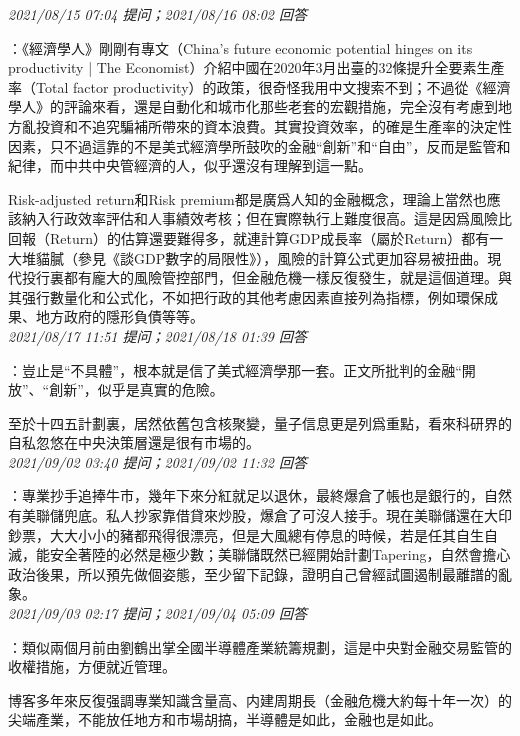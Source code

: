 \documentclass[twocolumn]{ctexart}
\begin{document}
\textit{\hfill\noindent\small 2021/08/15 07:04 提问；2021/08/16 08:02 回答}

：《經濟學人》剛剛有專文（China’s future economic potential hinges on its productivity | The Economist）介紹中國在2020年3月出臺的32條提升全要素生產率（Total factor productivity）的政策，很奇怪我用中文搜索不到；不過從《經濟學人》的評論來看，還是自動化和城市化那些老套的宏觀措施，完全沒有考慮到地方亂投資和不追究騙補所帶來的資本浪費。其實投資效率，的確是生產率的決定性因素，只不過這靠的不是美式經濟學所鼓吹的金融“創新”和“自由”，反而是監管和紀律，而中共中央管經濟的人，似乎還沒有理解到這一點。


Risk-adjusted return和Risk premium都是廣爲人知的金融概念，理論上當然也應該納入行政效率評估和人事績效考核；但在實際執行上難度很高。這是因爲風險比回報（Return）的估算還要難得多，就連計算GDP成長率（屬於Return）都有一大堆貓膩（參見《談GDP數字的局限性》），風險的計算公式更加容易被扭曲。現代投行裏都有龐大的風險管控部門，但金融危機一樣反復發生，就是這個道理。與其强行數量化和公式化，不如把行政的其他考慮因素直接列為指標，例如環保成果、地方政府的隱形負債等等。
\\

\textit{\hfill\noindent\small 2021/08/17 11:51 提问；2021/08/18 01:39 回答}

：豈止是“不具體”，根本就是信了美式經濟學那一套。正文所批判的金融“開放”、“創新”，似乎是真實的危險。

至於十四五計劃裏，居然依舊包含核聚變，量子信息更是列爲重點，看來科研界的自私忽悠在中央決策層還是很有市場的。
\\

\textit{\hfill\noindent\small 2021/09/02 03:40 提问；2021/09/02 11:32 回答}

：專業抄手追捧牛市，幾年下來分紅就足以退休，最終爆倉了帳也是銀行的，自然有美聯儲兜底。私人抄家靠借貸來炒股，爆倉了可沒人接手。現在美聯儲還在大印鈔票，大大小小的豬都飛得很漂亮，但是大風總有停息的時候，若是任其自生自滅，能安全著陸的必然是極少數；美聯儲既然已經開始計劃Tapering，自然會擔心政治後果，所以預先做個姿態，至少留下記錄，證明自己曾經試圖遏制最離譜的亂象。
\\

\textit{\hfill\noindent\small 2021/09/03 02:17 提问；2021/09/04 05:09 回答}

：類似兩個月前由劉鶴出掌全國半導體產業統籌規劃，這是中央對金融交易監管的收權措施，方便就近管理。

博客多年來反復强調專業知識含量高、内建周期長（金融危機大約每十年一次）的尖端產業，不能放任地方和市場胡搞，半導體是如此，金融也是如此。
\\
\end{document}
